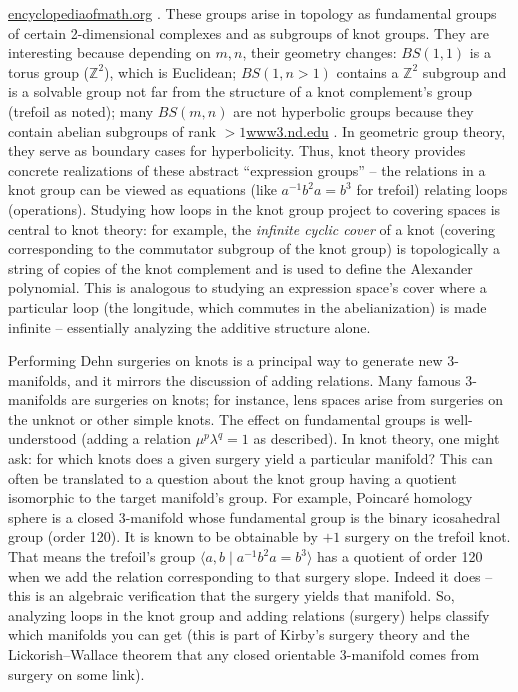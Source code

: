 \documentclass[11pt]{article}
\theoremstyle{remark}
\begin{document}
\href{https://encyclopediaofmath.org/wiki/Baumslag-Solitar_group#:~:text=non,group%20defined%20by%20the%20presentation}{encyclopediaofmath.org}
. These groups arise in topology as fundamental groups of certain 2-dimensional complexes and as subgroups of knot groups. They are interesting because depending on $m,n$, their geometry changes: $BS(1,1)$ is a torus group ($\mathbb{Z}^2$), which is Euclidean; $BS(1,n>1)$ contains a $\mathbb{Z}^2$ subgroup and is a solvable group not far from the structure of a knot complement’s group (trefoil as noted); many $BS(m,n)$ are not hyperbolic groups because they contain abelian subgroups of rank $>1$\href{https://www3.nd.edu/~gszekely/rtg/GTS/www3.nd.edu/_jquigle2/GSTS%20FA18/Week3.pdf#:~:text=%28b%29%20Finite%20groups%20are%20hyperbolic,2}{www3.nd.edu}
. In geometric group theory, they serve as boundary cases for hyperbolicity. Thus, knot theory provides concrete realizations of these abstract “expression groups” – the relations in a knot group can be viewed as equations (like $a^{-1}b^2a=b^3$ for trefoil) relating loops (operations). Studying how loops in the knot group project to covering spaces is central to knot theory: for example, the \textit{infinite cyclic cover} of a knot (covering corresponding to the commutator subgroup of the knot group) is topologically a string of copies of the knot complement and is used to define the Alexander polynomial. This is analogous to studying an expression space's cover where a particular loop (the longitude, which commutes in the abelianization) is made infinite – essentially analyzing the additive structure alone.

Performing Dehn surgeries on knots is a principal way to generate new 3-manifolds, and it mirrors the discussion of adding relations. Many famous 3-manifolds are surgeries on knots; for instance, lens spaces arise from surgeries on the unknot or other simple knots. The effect on fundamental groups is well-understood (adding a relation $\mu^p\lambda^q=1$ as described). In knot theory, one might ask: for which knots does a given surgery yield a particular manifold? This can often be translated to a question about the knot group having a quotient isomorphic to the target manifold’s group. For example, Poincaré homology sphere is a closed 3-manifold whose fundamental group is the binary icosahedral group (order 120). It is known to be obtainable by $+1$ surgery on the trefoil knot. That means the trefoil’s group $\langle a,b \mid a^{-1}b^2a=b^3\rangle$ has a quotient of order 120 when we add the relation corresponding to that surgery slope. Indeed it does – this is an algebraic verification that the surgery yields that manifold. So, analyzing loops in the knot group and adding relations (surgery) helps classify which manifolds you can get (this is part of Kirby’s surgery theory and the Lickorish–Wallace theorem that any closed orientable 3-manifold comes from surgery on some link).
\end{document}
